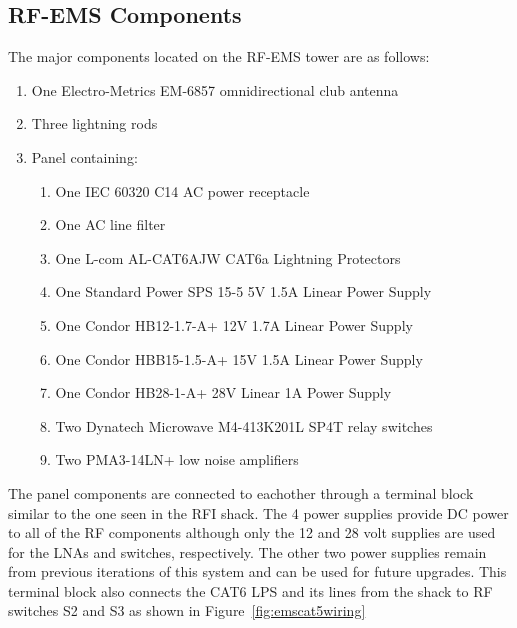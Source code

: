 \documentclass[titlepage]{article}
\begin{document}
\subsection{RF-EMS Components}\label{sec:higems}
The major components located on the RF-EMS tower are as follows:
\begin{enumerate}
  \item One Electro-Metrics EM-6857 omnidirectional club antenna
  \item Three lightning rods
  \item Panel containing:
  \begin{enumerate}
    \item One IEC 60320 C14 AC power receptacle
    \item One AC line filter
    \item One L-com AL-CAT6AJW CAT6a Lightning Protectors
    \item One Standard Power SPS 15-5 5V 1.5A Linear Power Supply
    \item One Condor HB12-1.7-A+ 12V 1.7A Linear Power Supply
    \item One Condor HBB15-1.5-A+ 15V 1.5A Linear Power Supply
    \item One Condor HB28-1-A+ 28V Linear 1A Power Supply
    \item Two Dynatech Microwave M4-413K201L SP4T relay switches
    \item Two PMA3-14LN+ low noise amplifiers
  \end{enumerate}
\end{enumerate}
The panel components are connected to eachother through a terminal block similar to the one seen in the RFI shack. The 4 power supplies provide DC power to all of the RF components although only the 12 and 28 volt supplies are used for the LNAs and switches, respectively. The other two power supplies remain from previous iterations of this system and can be used for future upgrades. This terminal block also connects the CAT6 LPS and its lines from the shack to RF switches S2 and S3 as shown in Figure~\ref{fig:emscat5wiring}
\end{document}
